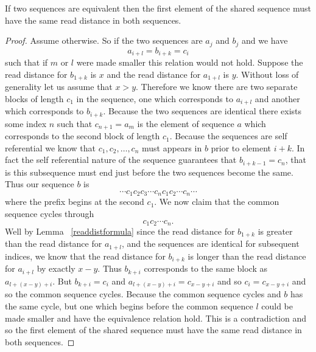 \documentclass[runningheads,a4paper]{llncs}
\begin{document}
\begin{theorem} If two sequences are equivalent then the first element of the shared sequence must have the same read distance in both sequences.
\end{theorem}
\begin{proof}
Assume otherwise. So if the two sequences are $a_j$ and $b_j$ and we have 
\begin{equation*}
a_{i+l} = b_{i+k} = c_{i}
\end{equation*}
such that if $m$ or $l$ were made smaller this relation would not hold. Suppose the read distance for $b_{1+k}$ is $x$ and the read distance for $a_{1+l}$ is $y$. Without loss of generality let us assume that $x>y$. 
Therefore we know there are two separate blocks of length $c_1$ in the sequence, one which corresponds to $a_{i+l}$ and another which corresponds to $b_{i+k}$.
Because the two sequences are identical there exists some index $n$ such that $c_{n+1}=a_{m}$ is the element of sequence $a$ which corresponds to the second block of length $c_1$. 
Because the sequences are self referential we know that $c_1, c_2, \ldots, c_{n}$  must appears in $b$ prior to element $i+k$. In fact the self referential nature of the sequence guarantees that $b_{i+k-1}=c_{n}$, that is this subsequence must end just before the two sequences become the same. Thus our sequence $b$ is  
\begin{equation*}
\cdots c_1 c_2 c_3 \cdots c_{n} c_1 c_2 \cdots c_n \cdots
\end{equation*}
where the prefix begins at the second $c_1$. We now claim that the common sequence cycles through
\begin{equation*}
c_1 c_2 \cdots c_n.
\end{equation*}
Well by Lemma ~\ref{readdistformula} since the read distance for $b_{1+k}$ is greater than the read distance for $a_{1+l}$, and the sequences are identical for subsequent indices, we know that the read distance for $b_{i+k}$ is longer than the read distance for $a_{i+l}$ by exactly $x-y$. Thus $b_{k+i}$ corresponds to the same block as $a_{l+(x-y)+i}$. But $b_{k+i} = c_{i}$ and $a_{l+(x-y)+i}=c_{x-y+i}$ and so $c_{i} = c_{x-y+i}$ and so the common sequence cycles. Because the common sequence cycles and $b$ has the same cycle, but one which begins before the common sequence $l$ could be made smaller and have the equivalence relation hold. This is a contradiction and so the first element of the shared sequence must have the same read distance in both sequences. 
\end{proof}
\end{document}
